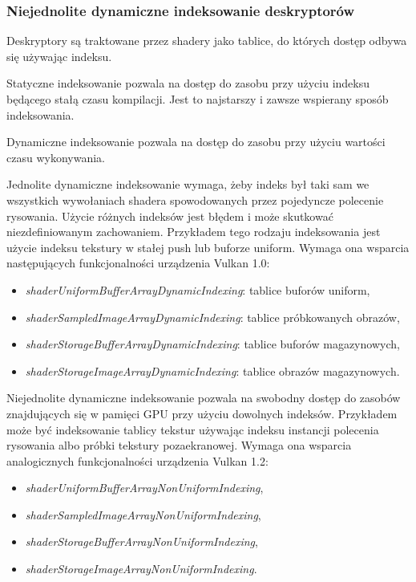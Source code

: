\subsubsection{Niejednolite dynamiczne indeksowanie deskryptorów}

Deskryptory są traktowane przez shadery jako tablice, do których dostęp odbywa się używając indeksu.

Statyczne indeksowanie pozwala na dostęp do zasobu przy użyciu indeksu będącego stałą czasu kompilacji. Jest to najstarszy i zawsze wspierany sposób indeksowania.

Dynamiczne indeksowanie pozwala na dostęp do zasobu przy użyciu wartości czasu wykonywania.

Jednolite dynamiczne indeksowanie wymaga, żeby indeks był taki sam we wszystkich wywołaniach shadera spowodowanych przez pojedyncze polecenie rysowania. Użycie różnych indeksów jest błędem i może skutkować niezdefiniowanym zachowaniem.
Przykładem tego rodzaju indeksowania jest użycie indeksu tekstury w stałej push lub buforze uniform.
Wymaga ona wsparcia następujących funkcjonalności urządzenia Vulkan 1.0:
\begin{itemize}
	\item {\textit{shaderUniformBufferArrayDynamicIndexing}}: tablice buforów uniform,
	\item {\textit{shaderSampledImageArrayDynamicIndexing}}: tablice próbkowanych obrazów,
	\item {\textit{shaderStorageBufferArrayDynamicIndexing}}: tablice buforów magazynowych,
	\item {\textit{shaderStorageImageArrayDynamicIndexing}}: tablice obrazów magazynowych.
\end{itemize}

Niejednolite dynamiczne indeksowanie pozwala na swobodny dostęp do zasobów znajdujących się w pamięci GPU przy użyciu dowolnych indeksów.
Przykładem może być indeksowanie tablicy tekstur używając indeksu instancji polecenia rysowania albo próbki tekstury pozaekranowej.
Wymaga ona wsparcia analogicznych funkcjonalności urządzenia Vulkan 1.2:
\begin{itemize}
	\item {\textit{shaderUniformBufferArrayNonUniformIndexing}},
	\item {\textit{shaderSampledImageArrayNonUniformIndexing}},
	\item {\textit{shaderStorageBufferArrayNonUniformIndexing}},
	\item {\textit{shaderStorageImageArrayNonUniformIndexing}}.
\end{itemize}

